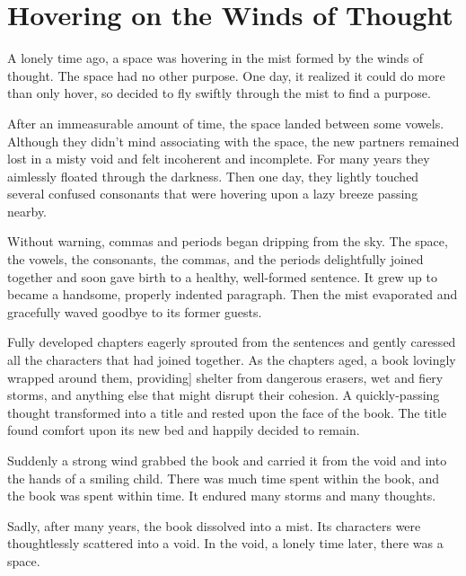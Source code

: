 \chapter{Hovering on the Winds of Thought}


A lonely time ago, a space was hovering in the mist formed by the winds of thought. The space had no other purpose. One day, it realized it could do more than only hover, so decided to fly swiftly through the mist to find a purpose.

After an immeasurable amount of time, the space landed between some vowels. Although they didn't mind associating with the space, the new partners remained lost in a misty void and felt incoherent and incomplete. For many years they aimlessly floated through the darkness. Then one day, they lightly touched several confused consonants that were hovering upon a lazy breeze passing nearby.

Without warning, commas and periods began dripping from the sky. The space, the vowels, the consonants, the commas, and the periods delightfully joined together and soon gave birth to a healthy, well-formed sentence. It grew up to became a handsome, properly indented paragraph. Then the mist evaporated and gracefully waved goodbye to its former guests.

Fully developed chapters eagerly sprouted from the sentences and gently caressed all the characters that had joined together. As the chapters aged, a book lovingly wrapped around them, providing] shelter from dangerous erasers, wet and fiery storms, and anything else that might disrupt their cohesion. A quickly-passing thought transformed into a title and rested upon the face of the book. The title found comfort upon its new bed and happily decided to remain.

Suddenly a strong wind grabbed the book and carried it from the void and into the hands of a smiling child. There was much time spent within the book, and the book was spent within time. It endured many storms and many thoughts.

Sadly, after many years, the book dissolved into a mist. Its characters were thoughtlessly scattered into a void.
\newpage
In the void, a lonely time later, there was a space.
